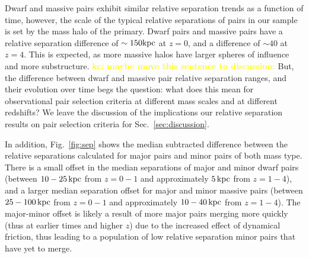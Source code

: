 \documentclass[twocolumn]{aastex631}
\newcommand{\kc}[1]{\textcolor{yellow}{\textbf{kc: #1}} }
\begin{document}
    Dwarf and massive pairs exhibit similar relative separation trends as a function of time, however, the scale of the typical relative separations of pairs in our sample is set by the mass halo of the primary.
    Dwarf pairs and massive pairs have a relative separation difference of $\sim150\mathrm{kpc}$ at $z=0$, and a difference of $\sim40$ at $z=4$.   
    This is expected, as more massive halos have larger spheres of influence and more substructure. 
    \kc{maybe move this sentence to discussion:}But, the difference between dwarf and massive pair relative separation ranges, and their evolution over time begs the question: what does this mean for observational pair selection criteria at different mass scales and at different redshifts? 
    We leave the discussion of the implications our relative separation results on pair selection criteria for Sec.~\ref{sec:discussion}. 
    
    In addition, Fig.~\ref{fig:sep} shows the median subtracted difference between the relative separations calculated for major pairs and minor pairs of both mass type. 
    There is a small offset in the median separations of major and minor dwarf pairs (between $10-25\,\mathrm{kpc}$ from  $z=0-1$ and approximately $5\,\mathrm{kpc}$ from $z=1-4$), and a larger median separation offset for major and minor massive pairs (between $25-100\,\mathrm{kpc}$ from  $z=0-1$ and approximately $10-40\,\mathrm{kpc}$ from $z=1-4$). 
    The major-minor offset is likely a result of more major pairs merging more quickly (thus at earlier times and higher $z$) due to the increased effect of dynamical friction, thus leading to a population of low relative separation minor pairs that have yet to merge.  
\end{document}

